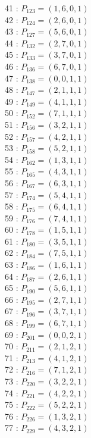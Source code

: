 \documentclass{article}
\begin{document}
{\begin{multicols}{3}
41 : $P_{123}=( 1, 6, 0, 1 )$\\
42 : $P_{124}=( 2, 6, 0, 1 )$\\
43 : $P_{127}=( 5, 6, 0, 1 )$\\
44 : $P_{132}=( 2, 7, 0, 1 )$\\
45 : $P_{133}=( 3, 7, 0, 1 )$\\
46 : $P_{136}=( 6, 7, 0, 1 )$\\
47 : $P_{138}=( 0, 0, 1, 1 )$\\
48 : $P_{147}=( 2, 1, 1, 1 )$\\
49 : $P_{149}=( 4, 1, 1, 1 )$\\
50 : $P_{152}=( 7, 1, 1, 1 )$\\
51 : $P_{156}=( 3, 2, 1, 1 )$\\
52 : $P_{157}=( 4, 2, 1, 1 )$\\
53 : $P_{158}=( 5, 2, 1, 1 )$\\
54 : $P_{162}=( 1, 3, 1, 1 )$\\
55 : $P_{165}=( 4, 3, 1, 1 )$\\
56 : $P_{167}=( 6, 3, 1, 1 )$\\
57 : $P_{174}=( 5, 4, 1, 1 )$\\
58 : $P_{175}=( 6, 4, 1, 1 )$\\
59 : $P_{176}=( 7, 4, 1, 1 )$\\
60 : $P_{178}=( 1, 5, 1, 1 )$\\
61 : $P_{180}=( 3, 5, 1, 1 )$\\
62 : $P_{184}=( 7, 5, 1, 1 )$\\
63 : $P_{186}=( 1, 6, 1, 1 )$\\
64 : $P_{187}=( 2, 6, 1, 1 )$\\
65 : $P_{190}=( 5, 6, 1, 1 )$\\
66 : $P_{195}=( 2, 7, 1, 1 )$\\
67 : $P_{196}=( 3, 7, 1, 1 )$\\
68 : $P_{199}=( 6, 7, 1, 1 )$\\
69 : $P_{201}=( 0, 0, 2, 1 )$\\
70 : $P_{211}=( 2, 1, 2, 1 )$\\
71 : $P_{213}=( 4, 1, 2, 1 )$\\
72 : $P_{216}=( 7, 1, 2, 1 )$\\
73 : $P_{220}=( 3, 2, 2, 1 )$\\
74 : $P_{221}=( 4, 2, 2, 1 )$\\
75 : $P_{222}=( 5, 2, 2, 1 )$\\
76 : $P_{226}=( 1, 3, 2, 1 )$\\
77 : $P_{229}=( 4, 3, 2, 1 )$\\

\end{multicols}}
\end{document}
